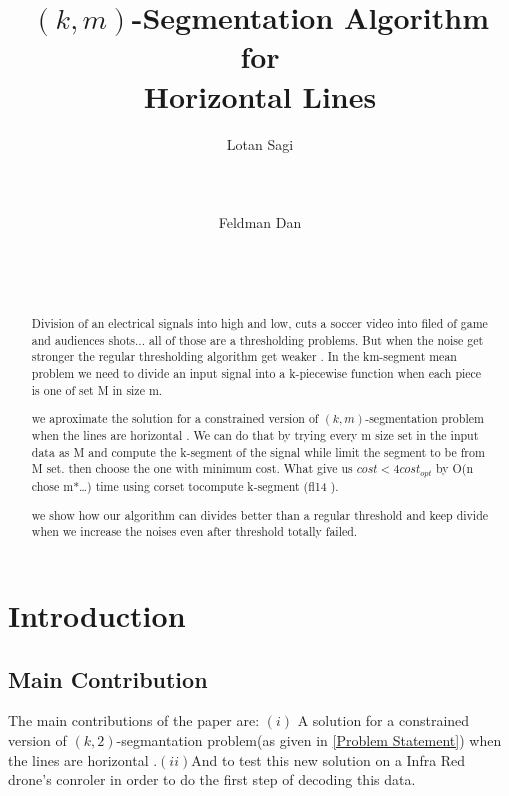 \documentclass{vldb}
\begin{document}
\title{$(k,m)$-Segmentation Algorithm for \\Horizontal Lines}


\author{
\alignauthor Lotan Sagi\\
       \\
       \\
       \\
\alignauthor Feldman Dan\\
       \\
       \\
       \\
}
\maketitle
\begin{abstract}
   
 Division of an electrical signals into high and low, cuts a soccer video into filed of game and audiences shots... all of those are a thresholding problems. But when the noise get stronger the regular thresholding algorithm get weaker . In the km-segment mean problem we need to divide an input signal into a k-piecewise function when each piece is one of set M in size m.

we aproximate the solution for a constrained version of $(k,m)$-segmentation problem when the lines are horizontal . We can do that by trying every m size set in the input data as M and compute the k-segment of the signal while limit the segment to be from M set. then choose the one with minimum cost. What give us $cost<4cost_{opt}$ by O(n chose m*…) time using corset tocompute k-segment (fl14 ).

we show how our algorithm can divides better than a regular threshold and keep divide when we increase the noises even after threshold totally failed.
\end{abstract}

\section{Introduction}
\subsection{Main Contribution}
The main contributions of the paper are: $(i)$ A solution for a constrained version of $(k,2)$-segmantation problem(as given in \ref{Problem Statement}) 
when the lines are horizontal .$(ii)$And to test this new solution on a Infra Red drone's conroler in order to do the first step of decoding this data.
\end{document}
